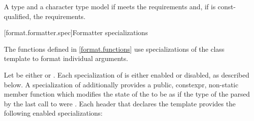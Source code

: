 \pnum
A type  and a character type 
model 
if  meets
the  requirements
and, if  is const-qualified,
the  requirements.

[format.formatter.spec]{Formatter specializations}
%

\pnum
The functions defined in \ref{format.functions} use
specializations of the class template  to format
individual arguments.

\pnum
Let  be either  or .
Each specialization of  is either enabled or disabled,
as described below.
%
A  specialization of 
additionally provides
a public, constexpr, non-static member function 
which modifies the state of the  to be as if
the type of the 
parsed by the last call to  were .
Each header that declares the template 
provides the following enabled specializations:
